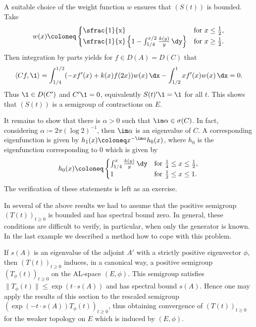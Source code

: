 \begin{example}
A suitable choice of the weight function $w$ ensures that $(S(t))$ is bounded.
Take
\begin{equation}\label{eq:c4-2.14}
w(x) \coloneq \begin{cases}
    \text{\sfrac{1}{x}} & \text{for } x \leq \frac{1}{2}, \\
    \text{\sfrac{1}{x}} \left\{1 - \int_{1/4}^{x/2} \frac{k(y)}{y} \, \dy \right\} & \text{for } x \geq \frac{1}{2}.
\end{cases}
\end{equation}
Then integration by parts yields for $f \in D(A) = D(C)$ that
\begin{align*}
\langle Cf,\1 \rangle = \int_{1/4}^{1/2} (-xf'(x) + k(x)f(2x))w(x) \, \dx - \int_{1/2}^{1} xf'(x)w(x) \, \dx = 0.
\end{align*}
Thus $\1 \in D(C')$ and $C'\1 = 0$, equivalently $S(t)'\1 = \1$ for all $t$.
This shows that $(S(t))$ is a semigroup of contractions on $E$.

It remains to show that there is $\alpha > 0$ such that $\im\alpha \in \sigma(C)$.
In fact, considering $\alpha \coloneq 2\pi(\log 2)^{-1}$,  then $\im\alpha$ is an eigenvalue of\/ $C$.
A corresponding eigenfunction is given by $h_{1}(x) \coloneq  x^{-\im\alpha}h_{0}(x)$, where $h_{0}$ is the eigenfunction corresponding to $0$ which is given by
\begin{equation}\label{eq:c4-2.15}
h_{0}(x) \coloneq  \begin{cases}
    \int_{1/4}^{x} \frac{k(y)}{y} \, \dy & \text{for } \frac{1}{4} \leq x \leq \frac{1}{2}, \\
    1 & \text{for } \frac{1}{2} \leq x \leq 1.
\end{cases}
\end{equation}
The verification of these statements is left as an exercise.
\end{example}
In several of the above results we had to assume that the positive semigroup $(T(t))_{t\geq 0}$ is bounded and has spectral bound zero.
In general, these conditions are difficult to verify, in particular, when only the generator is known.
In the last example we described a method how to cope with this problem. 

If\/ $s(A)$ is an eigenvalue of the adjoint $A'$ with a strictly positive eigenvector $\phi$, then $(T(t))_{t\geq 0}$ induces, in a canonical way, a positive semigroup $(T_{\phi}(t))_{t \geq 0}$ on the AL-space $(E,\phi)$.
This semigroup satisfies $\|T_{\phi}(t)\| \leq \exp(t \cdot s(A))$ and has spectral bound $s(A)$.
Hence one may apply the results of this section to the rescaled semigroup $(\exp(-t \cdot s(A))T_{\phi}(t))_{t \geq 0}$, thus obtaining convergence of\/ $(T(t))_{t \geq 0}$ for the weaker topology on $E$ which is induced by $(E,\phi)$.

